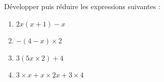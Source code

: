 \documentclass[exercice]{thedocument}%
\begin{document}
%
Développer puis réduire les expressions suivantes :
\begin{enumerate}
    \item $2x(x+1)-x$
    \item $-(4-x)\times 2$
    \item $3(5x\times 2)+4$
    \item $3\times x+x\times 2x+3\times 4$
\end{enumerate}
\end{document}
